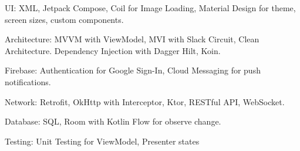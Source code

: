 \begin{cvparagraph}

UI: XML, Jetpack Compose, Coil for Image Loading, Material Design for theme, screen sizes, custom components.

Architecture: MVVM with ViewModel, MVI with Slack Circuit, Clean Architecture. Dependency Injection with Dagger Hilt, Koin.

Firebase: Authentication for Google Sign-In, Cloud Messaging for push notifications.

Network: Retrofit, OkHttp with Interceptor, Ktor, RESTful API, WebSocket.

Database: SQL, Room with Kotlin Flow for observe change.

Testing: Unit Testing for ViewModel, Presenter states

\end{cvparagraph}
